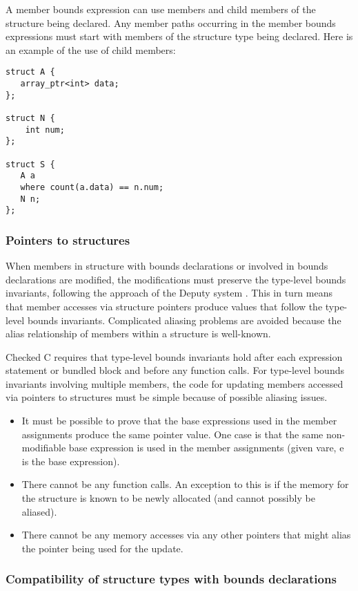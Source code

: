 A member bounds expression can use members and child members of the
structure being declared. Any member paths occurring in the member
bounds expressions must start with members of the structure type being
declared. Here is an example of the use of child members:

\begin{lstlisting}
struct A {
   array_ptr<int> data;
};

struct N {
    int num;
};

struct S {
   A a
   where count(a.data) == n.num;
   N n;
};
\end{lstlisting}

\subsubsection{Pointers to structures}

When members in structure with bounds declarations or involved in bounds declarations are
modified, the modifications must preserve the 
 type-level bounds invariants, following the approach of the Deputy
system \cite{Condit2007}.  This in turn means that member accesses via structure
pointers produce values that follow the type-level bounds invariants.  
Complicated aliasing problems are avoided because the
alias relationship of members within a structure is well-known.

Checked C requires that type-level bounds invariants hold after each expression
statement or bundled block and before any function calls.  For type-level bounds
invariants involving multiple members, the code for updating members accessed
via pointers to structures must be simple because of possible aliasing issues.
\begin{itemize}
\item It must be possible to prove that the base expressions used in the
member assignments produce the same pointer value.  One case is that the same
non-modifiable base expression is used in the member assignments  (given
var{e}, e is the base expression).
\item There cannot be any function calls.  An exception to this is if the memory
for the structure is known to be newly allocated (and cannot possibly be aliased).
\item There cannot be any memory accesses via any other pointers that might alias
the pointer being used for the update.
\end{itemize}

\subsubsection{Compatibility of structure types with bounds declarations}

